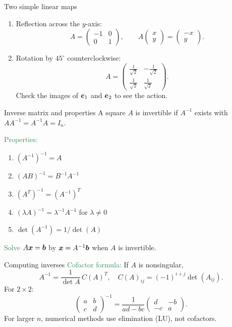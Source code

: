 \documentclass{beamer}
\begin{document}
\begin{frame}{Two simple linear maps}
\begin{enumerate}
\item Reflection across the $y$-axis:
\[
A=\begin{pmatrix}-1&0\\ 0&1\end{pmatrix},\qquad
A\begin{pmatrix}x\\y\end{pmatrix}=\begin{pmatrix}-x\\y\end{pmatrix}.
\]
\item Rotation by $45^\circ$ counterclockwise:
\[
A=\begin{pmatrix}\tfrac{1}{\sqrt{2}}&-\tfrac{1}{\sqrt{2}}\\[2pt]
\tfrac{1}{\sqrt{2}}&\tfrac{1}{\sqrt{2}}\end{pmatrix}.
\]
Check the images of $\boldsymbol e_1$ and $\boldsymbol e_2$ to see the action.
\end{enumerate}
\end{frame}


\begin{frame}{Inverse matrix and properties}
A square $A$ is invertible if $A^{-1}$ exists with $AA^{-1}=A^{-1}A=I_n$.
\bigskip

\textcolor{SeaGreen}{Properties:}
\begin{enumerate}
\item $(A^{-1})^{-1}=A$
\item $(AB)^{-1}=B^{-1}A^{-1}$
\item $(A^T)^{-1}=(A^{-1})^T$
\item $(\lambda A)^{-1}=\lambda^{-1}A^{-1}$ for $\lambda\neq 0$
\item $\det(A^{-1})=1/\det(A)$
\end{enumerate}

\textcolor{SeaGreen}{Solve} $A\boldsymbol x=\boldsymbol b$ by $\boldsymbol x=A^{-1}\boldsymbol b$ when $A$ is invertible.
\end{frame}

\begin{frame}{Computing inverses}
\textcolor{SeaGreen}{Cofactor formula:} If $A$ is nonsingular,
\[
A^{-1}=\frac{1}{\det A}\,C(A)^T,\quad C(A)_{ij}=(-1)^{i+j}\det(A_{ij}).
\]
For $2\times 2$:
\[
\begin{pmatrix}a&b\\ c&d\end{pmatrix}^{-1}
=\frac{1}{ad-bc}\begin{pmatrix}d&-b\\ -c&a\end{pmatrix}.
\]
For larger $n$, numerical methods use elimination (LU), not cofactors.
\end{frame}
\end{document}
